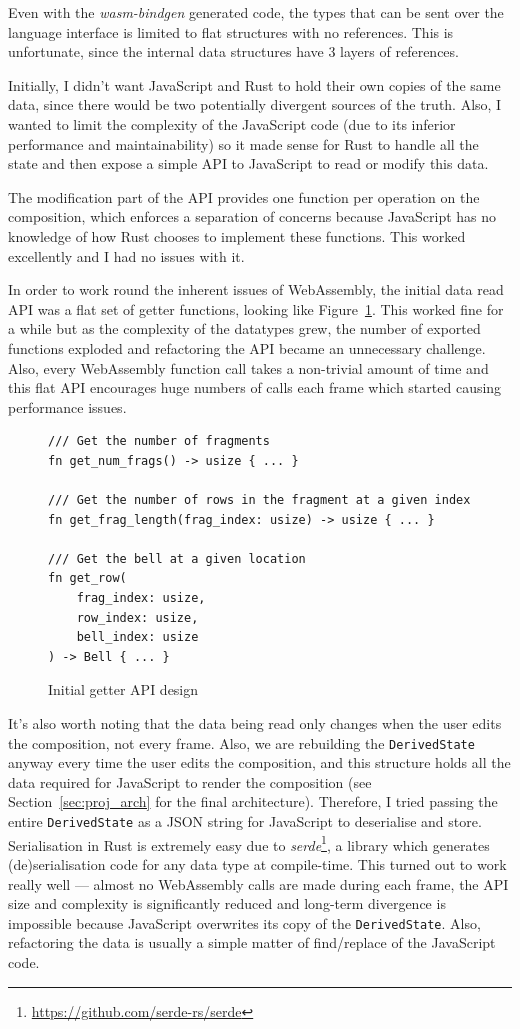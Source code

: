 \documentclass[12pt]{article}
\newcommand{\footurl}[1]{\footnote{\url{#1}}}
\begin{document}
Even with the \emph{wasm-bindgen} generated code, the types that can be sent
over the language interface is limited to flat structures with no references.  This is unfortunate,
since the internal data structures have 3 layers of references.

Initially, I didn't want JavaScript and Rust to hold their own copies of the same data, since there
would be two potentially divergent sources of the truth.  Also, I wanted to limit the complexity of
the JavaScript code (due to its inferior performance and maintainability) so it made sense for Rust
to handle all the state and then expose a simple API to JavaScript to read or modify this data.

The modification part of the API provides one function per operation on the composition, which
enforces a separation of concerns because JavaScript has no knowledge of how Rust chooses to
implement these functions.  This worked excellently and I had no issues with it.

In order to work round the inherent issues of WebAssembly, the initial data read API was a flat set
of getter functions, looking like Figure~\ref{fig:initial_api}.  This worked fine for a while but as
the complexity of the datatypes grew, the number of exported functions exploded and refactoring the
API became an unnecessary challenge.  Also, every WebAssembly function call takes a non-trivial
amount of time and this flat API encourages huge numbers of calls each frame which started causing
performance issues.

\begin{figure}
    \begin{verbatim}
/// Get the number of fragments
fn get_num_frags() -> usize { ... }

/// Get the number of rows in the fragment at a given index
fn get_frag_length(frag_index: usize) -> usize { ... }

/// Get the bell at a given location
fn get_row(
    frag_index: usize,
    row_index: usize,
    bell_index: usize
) -> Bell { ... }
    \end{verbatim}
    \caption{Initial getter API design}\label{fig:initial_api}
\end{figure}

It's also worth noting that the data being read only changes when the user edits the composition,
not every frame.  Also, we are rebuilding the \verb|DerivedState| anyway every time the user edits
the composition, and this structure holds all the data required for JavaScript to render the
composition (see Section~\ref{sec:proj_arch} for the final architecture).  Therefore, I tried
passing the entire \verb|DerivedState| as a JSON string for JavaScript to deserialise and store.
Serialisation in Rust is extremely easy due to
\emph{serde}\footurl{https://github.com/serde-rs/serde}, a library which generates
(de)serialisation code for any data type at compile-time.  This turned out to work really well ---
almost no WebAssembly calls are made during each frame, the API size and complexity is significantly
reduced and long-term divergence is impossible because JavaScript overwrites its copy of the
\verb|DerivedState|.  Also, refactoring the data is usually a simple matter of find/replace of the
JavaScript code.  
\end{document}
